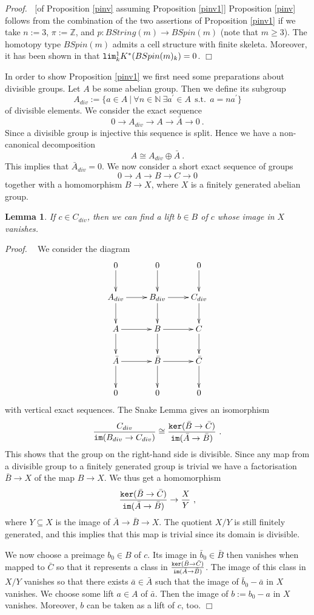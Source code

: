 \documentclass[12pt]{article}
\newtheorem{lem}[theorem]{Lemma}
\newcommand{\im}{{\tt im}}
\renewcommand{\ker}{{\tt ker}}
\def\hB{\hspace*{\fill}$\Box$ \newline\noindent}
\newcommand{\proof}{{\it Proof.$\:\:\:\:$}}
\newcommand{\nat}{{\mathbb{N}}}
\newcommand{\Z}{{\mathbb{Z}}}
\renewcommand{\lim}{{\tt lim}}
\begin{document}
\proof[of Proposition \ref{pinv} assuming Proposition \ref{pinv1}]
Proposition \ref{pinv} follows from the combination of the two assertions of Proposition \ref{pinv1}
if we take $n:=3$, $\pi:=\Z$, and $p:BString(m)\to BSpin(m)$ (note that $m\ge 3$).  The homotopy type $BSpin(m)$ admits a cell structure with finite skeleta. Moreover, it has been shown in \cite[Sec. 2]{MR0259946} that
$\lim^{1}_{k} K^{*}(BSpin(m)_{k})=0$.
\hB


In order to show Proposition \ref{pinv1}
we first
need some preparations about divisible groups.
Let $A$ be some abelian group. Then we define its subgroup 
$$A_{div}:=\{a\in A\:|\: \forall n\in \nat\: \exists a^{\prime}\in A \:\:\mbox{s.t.}\:\: a=na^{\prime}\}$$
of divisible elements.
We consider the exact sequence
$$0\to A_{div}\to A\to \bar A\to 0\ .$$
Since a divisible group is injective this sequence is split. Hence we have a non-canonical decomposition
$$A\cong A_{div}\oplus \bar A\ .$$ This implies that
 $\bar A_{div}=0$.
 We now consider a short exact sequence of groups
 $$0\to A\to B\to C\to 0$$
 together with a homomorphism $B\to X$, where $X$ is a finitely generated abelian group.
 \begin{lem}\label{lemhilfe}
If $c\in C_{div}$,
then we can find a lift $b\in B$ of $c$ whose image in $X$ vanishes.
\end{lem}
\proof
We consider the diagram
 $$\xymatrix{0\ar[d]&0\ar[d]&0\ar[d]\\  A_{div}\ar[d]\ar[r]&B_{div}\ar[r]\ar[d]&C_{div} \ar[d] \\ A\ar[r]\ar[d]&B\ar[r]\ar[d]&C\ar[d]\\ \bar A\ar[r]\ar[d]&\bar B\ar[r]\ar[d]&\bar C\ar[d]\\0&0&0}$$
with vertical exact sequences. The Snake Lemma gives an isomorphism
$$\frac{C_{div}}{\im(B_{div}\to C_{div})}\cong \frac{\ker(\bar B\to \bar C)}{\im(\bar A\to \bar B)}\ . $$
This shows that the group on the right-hand side is divisible.
 Since any map from a divisible group to a finitely generated group is trivial we have a factorisation
$\bar B\to X$ of the map $B\to X$. We thus get a homomorphism
$$ \frac{\ker(\bar B\to \bar C)}{\im(\bar A\to \bar B)}\to \frac{X}{Y}\ ,$$
where $Y\subseteq X$ is the image of
$\bar A\to \bar B\to X$.  The quotient $X/Y$ is still finitely generated, and this implies that this map is trivial since its domain is divisible.

 We now  choose a preimage $b_{0}\in B$ of $c$.
Its image in $\bar b_{0}\in \bar B$ then vanishes when mapped to $\bar C$ so that it represents a class in $\frac{\ker(\bar B\to \bar C)}{\im(\bar A\to \bar B)}$.
The image of this class in $X/Y$ vanishes so that there exists $\bar a\in \bar A$ such that the image of $\bar b_{0}-\bar a$ in $X$ vanishes. We choose some lift $a\in A$ of $\bar a$. Then the image of $b:=b_{0}-a$ in $X$ vanishes. Moreover, $b$ can be taken as a lift of $c$, too. 
\hB 
\end{document}
